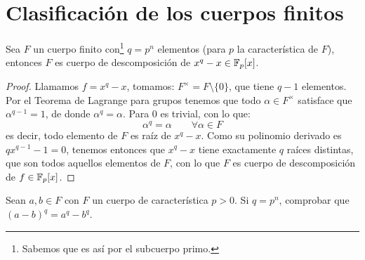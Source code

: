 \section{Clasificación de los cuerpos finitos}
\begin{prop}\label{prop:cuerpo_descomposicion}
    Sea $F$ un cuerpo finito con\footnote{Sabemos que es así por el subcuerpo primo.} $q=p^n$ elementos (para $p$ la característica de $F$), entonces $F$ es cuerpo de descomposición de $x^q-x\in \mathbb{F}_p[x]$.
    \begin{proof}
        Llamamos $f=x^q-x$, tomamos: $F^{\times} = F\setminus\{0\}$, que tiene $q-1$ elementos. Por el Teorema de Lagrange para grupos tenemos que todo $\alpha\in F^{\times}$ satisface que $\alpha^{q-1}=1$, de donde $\alpha^q = \alpha$. Para $0$ es trivial, con lo que:
        \begin{equation*}
            \alpha^q = \alpha \qquad \forall \alpha\in F
        \end{equation*}
        es decir, todo elemento de $F$ es raíz de $x^q-x$. Como su polinomio derivado es $qx^{q-1}-1 = 0$, tenemos entonces que $x^q-x$ tiene exactamente $q$ raíces distintas, que son todos aquellos elementos de $F$, con lo que $F$ es cuerpo de descomposición de $f\in \mathbb{F}_p[x]$.
    \end{proof}
\end{prop}

\begin{ejercicio}\label{ej:cuerpo_caracteristica} %
    Sean $a,b\in F$ con $F$ un cuerpo de característica $p>0$. Si $q=p^n$, comprobar que ${(a-b)}^{q} = a^q - b^q$.
\end{ejercicio}

